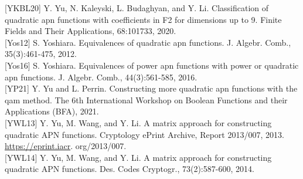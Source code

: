 \documentclass[10pt]{article}
\begin{document}
[YKBL20] Y. Yu, N. Kaleyski, L. Budaghyan, and Y. Li. Classification of quadratic apn functions with coefficients in F2 for dimensions up to 9. Finite Fields and Their Applications, 68:101733, 2020.\\[0pt]
[Yos12] S. Yoshiara. Equivalences of quadratic apn functions. J. Algebr. Comb., 35(3):461-475, 2012.\\[0pt]
[Yos16] S. Yoshiara. Equivalences of power apn functions with power or quadratic apn functions. J. Algebr. Comb., 44(3):561-585, 2016.\\[0pt]
[YP21] Y. Yu and L. Perrin. Constructing more quadratic apn functions with the qam method. The 6th International Workshop on Boolean Functions and their Applications (BFA), 2021.\\[0pt]
[YWL13] Y. Yu, M. Wang, and Y. Li. A matrix approach for constructing quadratic APN functions. Cryptology ePrint Archive, Report 2013/007, 2013. \href{https://eprint.iacr}{https://eprint.iacr}. org/2013/007.\\[0pt]
[YWL14] Y. Yu, M. Wang, and Y. Li. A matrix approach for constructing quadratic APN functions. Des. Codes Cryptogr., 73(2):587-600, 2014.
\end{document}
